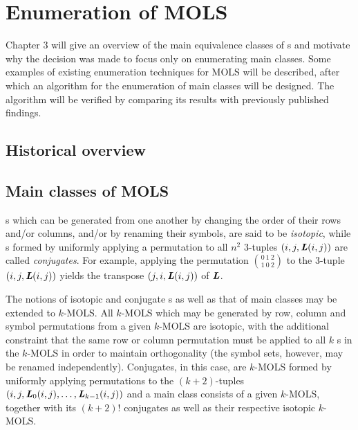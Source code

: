 \chapter{Enumeration of MOLS}
\vspace{-2em}
\minitoc

Chapter 3 will give an overview of the main equivalence classes of \lat s and motivate why the decision was made to focus only on enumerating main classes. Some examples of existing enumeration techniques for MOLS will be described, after which an algorithm for the enumeration of main classes will be designed.  The algorithm will be verified by comparing its results with previously published findings.

\section{Historical overview}

\section{Main classes of MOLS}
\lat s which can be generated from one another by changing the order of their rows and/or columns, and/or by renaming their symbols, are said to be \emph{isotopic},  while \lat s formed by uniformly applying a permutation to all $n^2$ $3$-tuples $(i,j, \mbox{\bf \emph{L}}(i,j))$ are called \emph{conjugates}. For example, applying the permutation $\binom{0 \ 1 \ 2}{1\ 0\ 2}$ to the $3$-tuple $(i,j, \mbox{\bf \emph{L}}(i,j))$ yields the transpose $(j,i, \mbox{\bf \emph{L}}(i,j))$ of $\mbox{\bf \emph{L}}$. 

The notions of    isotopic and  conjugate \lat s as well as that of main classes may be extended to $k$-MOLS.  All $k$-MOLS which may be generated by row, column and symbol permutations from  a given $k$-MOLS are isotopic, with the additional constraint that the same row or column permutation must be applied to all $k$ \lat s in the  $k$-MOLS in order to maintain orthogonality (the symbol sets, however, may be renamed independently). Conjugates, in this case, are $k$-MOLS formed by uniformly applying permutations to the $(k+2)$-tuples $(i,j, \mbox{\bf \emph{L}}_0(i,j), \ldots, \mbox{\bf \emph{L}}_{k-1}(i,j))$ and a main class consists of a given $k$-MOLS, together with its $(k+2)!$ conjugates as well as their respective isotopic $k$-MOLS.

